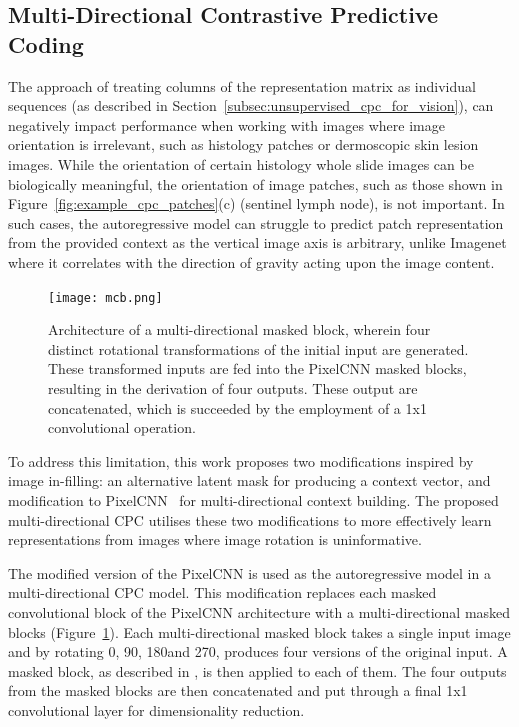 \subsection{Multi-Directional Contrastive Predictive Coding}
\label{subsec:unsupervised_mdcpc}
The approach of treating columns of the representation matrix as individual sequences (as described in Section~\ref{subsec:unsupervised_cpc_for_vision}), can negatively impact performance when working with images where image orientation is irrelevant, such as histology patches or dermoscopic skin lesion images. While the orientation of certain histology whole slide images can be biologically meaningful, the orientation of image patches, such as those shown in Figure~\ref{fig:example_cpc_patches}(c) (sentinel lymph node), is not important. In such cases, the autoregressive model can struggle to predict patch representation from the provided context as the vertical image axis is arbitrary, unlike Imagenet where it correlates with the direction of gravity acting upon the image content.

\begin{figure}[h]
	\centering
	\texttt{[image: mcb.png]}
	\caption{Architecture of a multi-directional masked block, wherein four distinct rotational transformations of the initial input are generated. These transformed inputs are fed into the PixelCNN masked blocks, resulting in the derivation of four outputs. These output are concatenated, which is succeeded by the employment of a 1x1 convolutional operation.}
	\label{fig:multi-directional_masked_block}
\end{figure}

To address this limitation, this work proposes two modifications inspired by image in-filling: an alternative latent mask for producing a context vector, and modification to PixelCNN~\citep{oord2016pixel} for multi-directional context building. The proposed multi-directional CPC utilises these two modifications to more effectively learn representations from images where image rotation is uninformative.

The modified version of the PixelCNN is used as the autoregressive model in a multi-directional CPC model. This modification replaces each masked convolutional block of the PixelCNN architecture with a multi-directional masked blocks (Figure~\ref{fig:multi-directional_masked_block}). Each multi-directional masked block takes a single input image and by rotating 0\textdegree, 90\textdegree, 180\textdegree and 270\textdegree, produces four versions of the original input. A masked block, as described in \cite{oord2016pixel}, is then applied to each of them. The four outputs from the masked blocks are then concatenated and put through a final 1x1 convolutional layer for dimensionality reduction.

